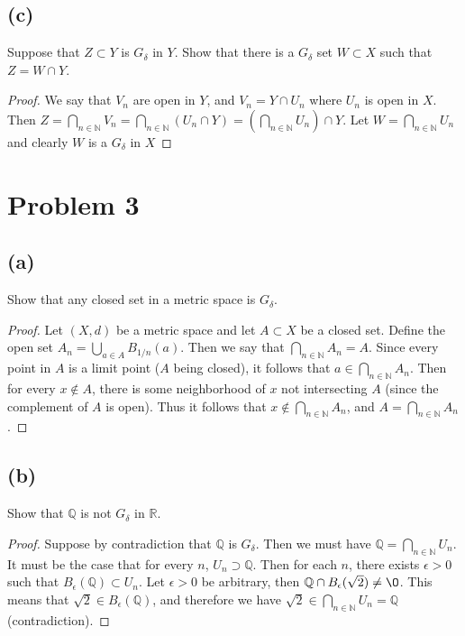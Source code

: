 \documentclass{article}
\theoremstyle{definition}
\begin{document}
\subsection*{(c)}
\begin{mdframed}
    Suppose that $Z \subset Y$ is $G_\delta$ in $Y$. Show that there is a $G_\delta$ set $W \subset X$ such that $Z = W \cap Y$.
\end{mdframed}
\begin{proof}
    We say that $V_n$ are open in $Y$, and $V_n = Y \cap U_n$ where $U_n$ is open in $X$. Then $Z = \bigcap_{n \in \mathbb{N}} V_n = \bigcap_{n \in \mathbb{N}}(U_n \cap Y) = (\bigcap_{n \in \mathbb{N}}U_n) \cap Y$.
    Let $W = \bigcap_{n \in \mathbb{N}}U_n$ and clearly $W$ is a $G_\delta$ in $X$
\end{proof}
\section*{Problem 3}
\subsection*{(a)}
\begin{mdframed}
    Show that any closed set in a metric space is $G_\delta$.
\end{mdframed}
\begin{proof}
    Let $(X,d)$ be a metric space and let $A \subset X$ be a closed set.
    Define the open set $A_n = \bigcup_{a \in A} B_{1 / n}(a)$.
    Then we say that $\bigcap_{n \in \mathbb{N}}A_n = A$. Since every point in $A$ is a limit point ($A$ being closed),
    it follows that $a \in \bigcap_{n \in \mathbb{N}}A_n$. Then for every $x \notin A$, there is some neighborhood of $x$ 
    not intersecting $A$ (since the complement of $A$ is open). Thus it follows that $x \notin \bigcap_{n \in \mathbb{N}}A_n$, and $A = \bigcap_{n \in \mathbb{N}}A_n$.
\end{proof}
\subsection*{(b)}
\begin{mdframed}[]
    Show that $\mathbb{Q}$ is not $G_\delta$ in $\mathbb{R}$.
\end{mdframed}
\begin{proof}
    Suppose by contradiction that $\mathbb{Q}$ is $G_\delta$.
    Then we must have $\mathbb{Q} = \bigcap_{n \in \mathbb{N}}U_n$. It must be
    the case that for every $n$, $U_n \supset \mathbb{Q}$.
    Then for each $n$, there exists $\epsilon > 0$ such that $B_\epsilon(\mathbb{Q}) \subset U_n$.
    Let $\epsilon > 0$ be arbitrary, then $\mathbb{Q} \cap B_\epsilon(\sqrt{2}) \neq \O$.
    This means that $\sqrt{2} \in B_\epsilon(\mathbb{Q})$, and therefore we have $\sqrt{2} \in \bigcap_{n \in \mathbb{N}}U_n = \mathbb{Q}$ (contradiction).
\end{proof}
\end{document}
